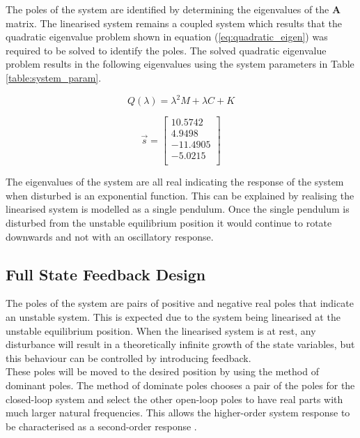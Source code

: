 The poles of the system are identified by determining the eigenvalues of the $\boldsymbol{A}$ matrix. The linearised system remains a coupled system which results that the quadratic eigenvalue problem shown in equation (\ref{eq:quadratic_eigen}) was required to be solved to identify the poles. The solved quadratic eigenvalue problem results in the following eigenvalues using the system parameters in Table \ref{table:system_param}.

\begin{equation} \label{eq:quadratic_eigen}
Q(\lambda) =\lambda^{2}M + \lambda C + K
\end{equation}

$$
\vec{s} = 
\begin{bmatrix}
10.5742 \\
4.9498	\\
-11.4905 \\
-5.0215 \\

\end{bmatrix}
$$

The eigenvalues of the system are all real indicating the response of the system when disturbed is an exponential function. This can be explained by realising the linearised system is modelled as a single pendulum. Once the single pendulum is disturbed from the unstable equilibrium position it would continue to rotate downwards and not with an oscillatory response. 


\subsection{Full State Feedback Design}
The poles of the system are pairs of positive and negative real poles that indicate an unstable system. This is expected due to the system being linearised at the unstable equilibrium position. When the linearised system is at rest, any disturbance will result in a theoretically infinite growth of the state variables, but this behaviour can be controlled by introducing feedback. \\

These poles will be moved to the desired position by using the method of dominant poles. The method of dominate poles chooses a pair of the poles for the closed-loop system and select the other open-loop poles to have real parts with much larger natural frequencies. This allows the higher-order system response to be characterised as a second-order response \citep{textbook}. \\

